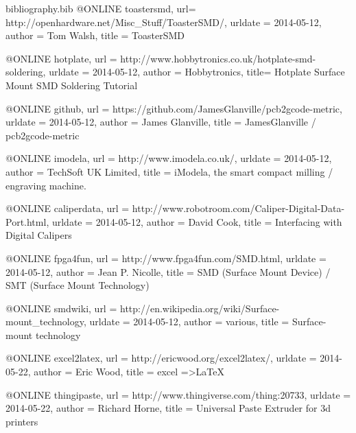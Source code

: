 
\begin{filecontents}{bibliography.bib}
@ONLINE {toastersmd,
    url= {http://openhardware.net/Misc_Stuff/ToasterSMD/},
    urldate = {2014-05-12},
    author = {Tom Walsh},
    title = {ToasterSMD}}
    
@ONLINE {hotplate,
	url = {http://www.hobbytronics.co.uk/hotplate-smd-soldering},
	urldate = {2014-05-12},
	author = {Hobbytronics},
	title= {Hotplate Surface Mount SMD Soldering Tutorial}}
	
@ONLINE {github,
	url = {https://github.com/JamesGlanville/pcb2gcode-metric},
	urldate = {2014-05-12},
	author = {James Glanville},
	title = {JamesGlanville / pcb2gcode-metric}}
	
@ONLINE {imodela,
	url = {http://www.imodela.co.uk/},
	urldate = {2014-05-12},
	author = {TechSoft UK Limited},
	title = {iModela, the smart compact milling / engraving machine.}}
	
@ONLINE {caliperdata,
	url = {http://www.robotroom.com/Caliper-Digital-Data-Port.html},
	urldate = {2014-05-12},
	author = {David Cook},
	title = {Interfacing with Digital Calipers}}
	
@ONLINE {fpga4fun,
	url = {http://www.fpga4fun.com/SMD.html},
	urldate = {2014-05-12},
	author = {Jean P. Nicolle},
	title = {SMD (Surface Mount Device) / SMT (Surface Mount Technology)}}
	
@ONLINE {smdwiki,
	url = {http://en.wikipedia.org/wiki/Surface-mount_technology},
	urldate = {2014-05-12},
	author = {various},
	title = {Surface-mount technology}}
	
@ONLINE {excel2latex,
	url = {http://ericwood.org/excel2latex/},
	urldate = {2014-05-22},
	author = {Eric Wood},
	title = {excel =\textgreater LaTeX}}
	
@ONLINE {thingipaste,
	url = {http://www.thingiverse.com/thing:20733},
	urldate = {2014-05-22},
	author = {Richard Horne},
	title = {Universal Paste Extruder for 3d printers}}
\end{filecontents}

\documentclass[a4paper,11pt]{article}  %
\usepackage[english]{babel}            %
\usepackage{fullpage}                  %
\usepackage{listings}
\usepackage{graphicx}                  %

\usepackage{tikz}
\usetikzlibrary{shapes,arrows}

\usepackage{appendix}
\usepackage{color}
\usepackage{hyperref}

